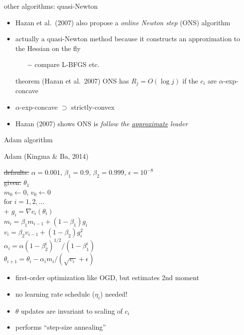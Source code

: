 \documentclass[svgnames,
               hyperref={colorlinks,citecolor=DeepPink4,linkcolor=FireBrick,urlcolor=Maroon},
               usepdftitle=false]  %
               {beamer}
\newcommand{\grad}{\nabla}
\newcommand{\eps}{\epsilon}
\begin{document}
\begin{frame}{other algorithms: quasi-Newton}

\begin{itemize}
\item Hazan et al.~(2007) also propose a \emph{online Newton step} (ONS) algorithm
\item actually a quasi-Newton method because it constructs an approximation to the Hessian on the fly
    \begin{itemize}
    \item[$-$] compare L-BFGS etc.
    \end{itemize}

\begin{block}{theorem (Hazan et al.~2007)}
ONS has $R_j = O(\log j)$ if the $c_i$ are $\alpha$-exp-concave
\end{block}

\item $\alpha$-exp-concave $\supset$ strictly-convex
\item Hazan (2007) shows ONS is \emph{follow the \underline{approximate} leader}
\end{itemize}
\end{frame}


\begin{frame}{Adam algorithm}

\begin{block}{Adam (Kingma \& Ba, 2014)}

\begin{pseudo*}
\st{defaults:} $\alpha=0.001$, $\beta_1=0.9$, $\beta_2=0.999$, $\eps=10^{-8}$ \\
\st{given:} $\theta_1$ \\
$m_0 \gets 0$, $v_0 \gets 0$ \\
for $i=1,2,\dots$ \\+
    $g_i = \grad c_i(\theta_i)$ \\
    $m_i = \beta_1 m_{i-1} + (1-\beta_1) g_i$  \hspace{15mm}  \\
    $v_i = \beta_2 v_{i-1} + (1-\beta_2) g_i^2$  \hspace{17mm}  \\
    $\alpha_i = \alpha (1-\beta_2^i)^{1/2} / (1-\beta_1^i)$  \hspace{13mm}  \\
    $\theta_{i+1} = \theta_i - \alpha_i m_i / (\sqrt{v_i\,} + \eps)$
\end{pseudo*}
\end{block}

\begin{itemize}
\item first-order optimization like OGD, but estimates 2nd moment
\item no learning rate schedule ($\eta_i$) needed!
\item $\theta$ updates are invariant to scaling of $c_i$
\item performs ``step-size annealing''
\end{itemize}
\end{frame}
\end{document}
